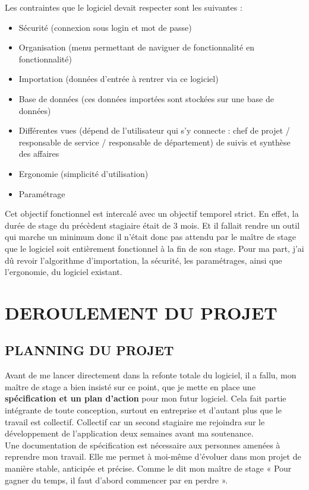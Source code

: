 Les contraintes que le logiciel devait respecter sont les suivantes :\\
\begin{itemize}
\item Sécurité (connexion sous login et mot de passe)
\item Organisation (menu permettant de naviguer de fonctionnalité en fonctionnalité)
\item Importation (données d’entrée à rentrer via ce logiciel)
\item Base de données (ces données importées sont stockées sur une base de données)
\item Différentes vues (dépend de l’utilisateur qui s’y connecte : chef de projet / responsable de service / responsable de département) de suivis et synthèse des affaires
\item Ergonomie (simplicité d’utilisation)
\item Paramétrage\\
\end{itemize}

Cet objectif fonctionnel est intercalé avec un objectif temporel strict. En effet, la durée de stage du précèdent stagiaire était de 3 mois. Et il fallait rendre un outil qui marche un minimum donc il n’était donc pas attendu par le maître de stage que le logiciel soit entièrement fonctionnel à la fin de son stage.
Pour ma part, j’ai dû revoir l’algorithme d’importation, la sécurité, les paramétrages, ainsi que l’ergonomie, du logiciel existant.

\section{DEROULEMENT DU PROJET}
\subsection{PLANNING DU PROJET}

Avant de me lancer directement dans la refonte totale du logiciel, il a fallu, mon maître de stage a bien insisté sur ce point, que je mette en place une \textbf{spécification et un plan d’action} pour mon futur logiciel. Cela fait partie intégrante de toute conception, surtout en entreprise et d’autant plus que le travail est collectif.  Collectif car un second stagiaire me rejoindra sur le développement de l’application deux semaines avant ma soutenance.\\

Une documentation de spécification est nécessaire aux personnes amenées à reprendre mon travail. Elle me permet à moi-même d’évoluer dans mon projet de manière stable, anticipée et précise. Comme le dit mon maître de stage « Pour gagner du temps, il faut d’abord commencer par en perdre ». \\


